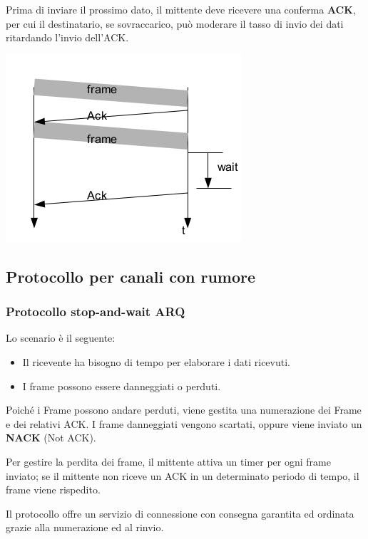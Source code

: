             Prima di inviare il prossimo dato, il mittente deve ricevere una conferma \textbf{ACK}, per cui il destinatario, se sovraccarico, può moderare il tasso di invio dei dati ritardando l'invio dell'ACK.

            \begin{center}
                \includegraphics[scale=0.6]{chapters/3/assets/schema_h.png}
            \end{center}

    \subsection{Protocollo per canali con rumore}
        \subsubsection{Protocollo stop-and-wait ARQ}
            Lo scenario è il seguente:
            \begin{itemize}
                \item Il ricevente ha bisogno di tempo per elaborare i dati ricevuti.
                \item I frame possono essere danneggiati o perduti.
            \end{itemize}

            Poiché i Frame possono andare perduti, viene gestita una numerazione dei Frame e dei relativi ACK. I frame danneggiati vengono scartati, oppure viene inviato un \textbf{NACK} (Not ACK).

            Per gestire la perdita dei frame, il mittente attiva un timer per ogni frame inviato; se il mittente non riceve un ACK in un determinato periodo di tempo, il frame viene rispedito.
            
            Il protocollo offre un servizio di connessione con consegna garantita ed ordinata grazie alla numerazione ed al rinvio.

